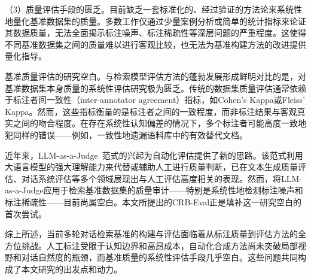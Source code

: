 （3）质量评估手段的匮乏。目前缺乏一套标准化的、经过验证的方法论来系统性地量化基准数据集的质量。多数工作仅通过少量案例分析或简单的统计指标来论证其数据质量，无法全面揭示标注噪声、标注稀疏性等深层问题的严重程度。这使得不同基准数据集之间的质量难以进行客观比较，也无法为基准构建方法的改进提供量化指导。


基准质量评估的研究空白。与检索模型评估方法的蓬勃发展形成鲜明对比的是，对基准数据集本身质量的系统性评估研究极为匮乏。传统的数据集质量评估通常依赖于标注者间一致性（inter-annotator agreement）指标，如Cohen's Kappa或Fleiss' Kappa。然而，这些指标衡量的是标注者之间的一致程度，而非标注结果与客观真实之间的吻合程度。在存在系统性认知偏差的情况下，多个标注者可能高度一致地犯同样的错误——例如，一致性地遗漏语料库中的有效替代文档。

近年来，LLM-as-a-Judge~\citep{zheng2023judging}范式的兴起为自动化评估提供了新的思路。该范式利用大语言模型的强大理解能力来代替或辅助人工进行质量判断，已在文本生成质量评估、对话系统评估等多个领域展现出与人工评估高度相关的表现。然而，将LLM-as-a-Judge应用于检索基准数据集的质量审计——特别是系统性地检测标注噪声和标注稀疏性——目前尚属空白。本文所提出的CRB-Eval正是填补这一研究空白的首次尝试。

综上所述，当前多轮对话检索基准的构建与评估面临着从标注质量到评估方法的全方位挑战。人工标注受限于认知边界和高昂成本，自动化合成方法尚未突破局部视野和对话自然度的瓶颈，而基准质量的系统性评估手段几乎空白。这些问题共同构成了本文研究的出发点和动力。









